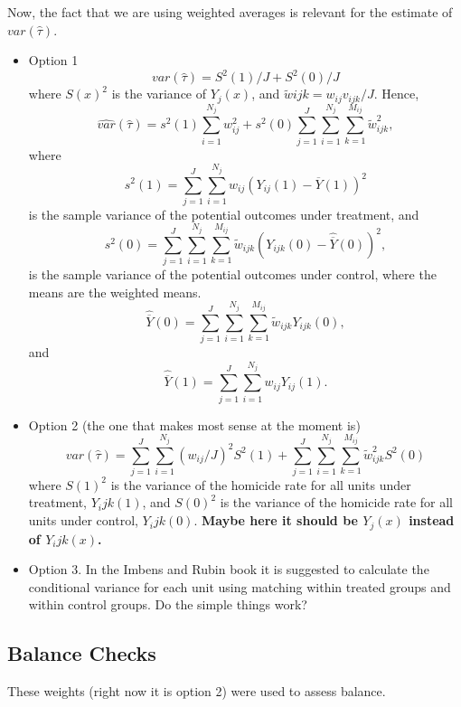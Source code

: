 \documentclass{article}[11 pt]
\begin{document}
Now, the fact that we are using weighted averages is relevant for the estimate of $var(\hat{\tau}).$ %
\begin{itemize}
\item Option 1
$$var(\hat{\tau}) = S^2(1)/J +S^2(0)/J $$
where $S(x)^2$ is the variance of $Y_j(x)$, and  $\tilde{w}{ijk}=w_{ij}v_{ijk}/J$. Hence, 
$$\hat{var}(\hat{\tau}) = s^2(1)\sum_{i=1}^{N_j}w_{ij}^2 +s^2(0)\sum_{j=1}^{J}\sum_{i=1}^{N_j}\sum_{k=1}^{M_{ij}}\tilde{w}^2_{ijk},$$
 where $$s^2(1) =  \sum_{j=1}^{J}\sum_{i=1}^{N_j}w_{ij}(Y_{ij}(1)-\overline{Y}(1))^2 $$ is the sample variance of the potential outcomes under treatment, and 
$$s^2(0) = \sum_{j=1}^{J}\sum_{i=1}^{N_j}\sum_{k=1}^{M_{ij}}\tilde{w}_{ijk}(Y_{ijk}(0)-\hat{\overline{Y}}(0))^2,$$ is the sample variance of the potential outcomes under control, where the means are the weighted means. $$\hat{\overline{Y}}(0)=\sum_{j=1}^{J}\sum_{i=1}^{N_j}\sum_{k=1}^{M_{ij}}\tilde{w}_{ijk}Y_{ijk}(0),$$ and
$$\hat{\overline{Y}}(1)=\sum_{j=1}^{J}\sum_{i=1}^{N_j}w_{ij}Y_{ij}(1).$$

\item Option 2 (the one that makes most sense at the moment is)
$$var(\hat{\tau}) = \sum_{j=1}^{J}\sum_{i=1}^{N_j}(w_{ij}/J)^2 S^2(1) + \sum_{j=1}^{J}\sum_{i=1}^{N_j}\sum_{k=1}^{M_{ij}}\tilde{w}_{ijk}^2 S^2(0)  $$
where $S(1)^2$ is the variance of the homicide rate for all units under treatment, $Y_ijk(1)$, and
 $S(0)^2$ is the variance of the homicide rate for all units under control, $Y_ijk(0)$. 
\textbf{Maybe here it should be $Y_j(x)$ instead of $Y_ijk(x)$.}

\item Option 3. In the Imbens and Rubin book it is suggested to calculate the conditional variance for each unit using matching within treated groups and within control groups.  Do the simple things work? 
\end{itemize}

\subsection{Balance Checks}
These weights (right now it is option 2) were used to assess balance.
\end{document}
